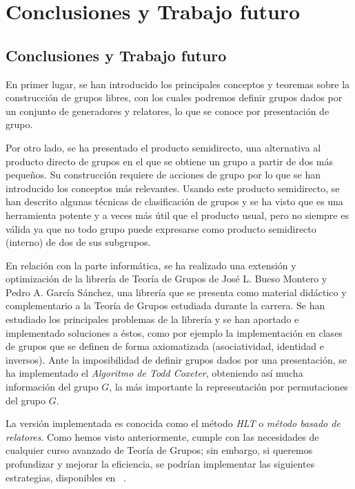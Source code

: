 \newpage
\blankpage
\part{Conclusiones y Trabajo futuro}
\chapter{Conclusiones y Trabajo futuro}


En primer lugar, se han introducido los principales conceptos y teoremas sobre la construcción de grupos libres, con los cuales podremos definir grupos dados por un conjunto de generadores y relatores, lo que se conoce por presentación de grupo.


Por otro lado, se ha presentado el producto semidirecto, una alternativa al producto directo de grupos en el que se obtiene un grupo a partir de dos más pequeños. Su construcción requiere de acciones de grupo por lo que se han introducido los conceptos más relevantes. Usando este producto semidirecto, se han descrito algunas técnicas de clasificación de grupos y se ha visto que es una herramienta potente y a veces más útil que el producto usual, pero no siempre es válida ya que no todo grupo puede expresarse como producto semidirecto (interno) de dos de sus subgrupos.





En relación con la parte informática, se ha realizado una
extensión y optimización de la librería de Teoría de Grupos de José L. Bueso Montero y Pedro A. García Sánchez, una librería que se presenta como material didáctico y complementario a la Teoría de Grupos estudiada durante la carrera. Se han estudiado los principales problemas de la librería y se han aportado e implementado soluciones a éstos, como por ejemplo la implementación en clases de grupos que se definen de forma axiomatizada (asociatividad, identidad e inversos). Ante la imposibilidad de definir grupos dados por una presentación, se ha implementado el \textit{Algoritmo de Todd Coxeter}, obteniendo así mucha información del grupo $G$, la más importante la representación por permutaciones del grupo $G$.



La versión implementada es conocida como el método \textit{HLT} o \textit{método basado de relatores}. Como hemos visto anteriormente, cumple con las necesidades de cualquier curso avanzado de Teoría de Grupos; sin embargo, si queremos profundizar y mejorar la eficiencia, se podrían implementar las siguientes estrategias, disponibles en ~\cite{green}.

